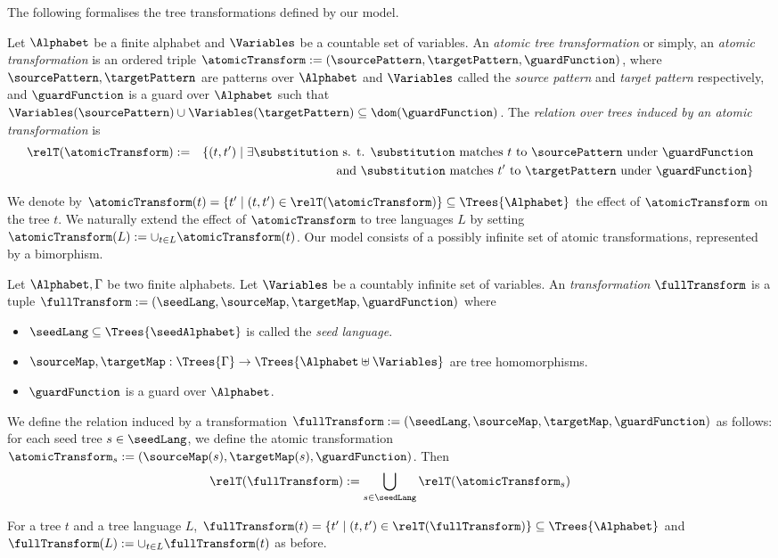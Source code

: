The following formalises the tree transformations defined by our model.
\begin{definition}\label{def:atomicAction}
  Let $\Alphabet$ be a finite alphabet and $\Variables$ be a countable
  set of variables. An \emph{atomic tree transformation} or simply, an
  \emph{atomic transformation} is an ordered triple $\atomicTransform :=
  (\sourcePattern, \targetPattern, \guardFunction)$, where $\sourcePattern,
  \targetPattern$ are patterns over $\Alphabet$ and $\Variables$ called the
  \emph{source pattern} and \emph{target pattern} respectively, and
  $\guardFunction$ is a guard over $\Alphabet$ such that
  $\Variables(\sourcePattern) \cup \Variables(\targetPattern)
  \subseteq \dom(\guardFunction)$. The \emph{relation over trees induced by an atomic
  transformation} is
  \begin{eqnarray*}
    \relT(\atomicTransform)
    & := & \{(t,t') \mid \exists \substitution \mbox{ s. t. } \substitution \mbox{ matches } t  \mbox{ to } \sourcePattern \mbox{ under } \guardFunction\\
    &   & \mbox{ and } \substitution \mbox{ matches } t'  \mbox{ to } \targetPattern \mbox{ under } \guardFunction \}
  \end{eqnarray*}
\end{definition}
We denote by $\atomicTransform(t) = \{t' \mid (t,t') \in
\relT(\atomicTransform)\}\subseteq \Trees{\Alphabet}$ the effect of $\atomicTransform$ on
the tree $t$. We naturally extend the effect of $\atomicTransform$ to tree
languages $L$ by setting $\atomicTransform(L) := \cup_{t \in L}\atomicTransform(t)$. Our
model consists of a possibly infinite set of atomic transformations, represented by a bimorphism.

\begin{definition}[Transformation]\label{def:action}
  Let $\Alphabet, \Gamma$ be two finite alphabets. Let $\Variables$ be
  a countably infinite set of variables. An \emph{transformation}
  $\fullTransform$ is a tuple $\fullTransform := (\seedLang,
  \sourceMap, \targetMap, \guardFunction)$ where
  \begin{itemize}
    \item $\seedLang \subseteq \Trees{\seedAlphabet}$ is called the \emph{seed language}.
    \item $\sourceMap, \targetMap : \Trees{\Gamma} \to \Trees{\Alphabet \uplus \Variables}$ are tree homomorphisms.
    \item $\guardFunction$ is a guard over $\Alphabet$.
  \end{itemize}
  We define the relation induced by a transformation $\fullTransform :=
  (\seedLang, \sourceMap, \targetMap, \guardFunction)$
  as follows: for each seed tree $s \in \seedLang$, we define the
  atomic transformation $\atomicTransform_s:= (\sourceMap(s), \targetMap(s),
  \guardFunction)$. Then
  \[ \relT(\fullTransform) := \bigcup_{s \in \seedLang}\relT(\atomicTransform_s) \]
\end{definition}
For a tree $t$ and a tree language $L$, $\fullTransform(t) = \{t' \mid (t,t') \in
\relT(\fullTransform)\}\subseteq \Trees{\Alphabet}$ and $\fullTransform(L) := \cup_{t
\in L}\fullTransform(t)$ as before.
